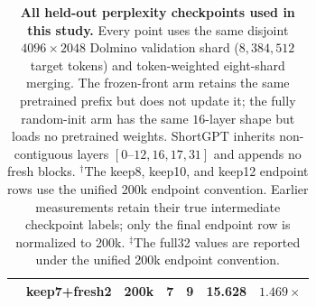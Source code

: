 \begin{table}[t]
{\begin{tabular}{@{}llrrrrr@{}}
& keep7+fresh2 & 200k & 7 & 9 & 15.628 & $1.469\times$ \\
\bottomrule
\end{tabular}%
}
\caption{\textbf{All held-out perplexity checkpoints used in this study.}
Every point uses the same disjoint $4096\times2048$ Dolmino validation shard
($8{,}384{,}512$ target tokens) and token-weighted eight-shard merging. The
frozen-front arm retains the same pretrained prefix but does not update it; the
fully random-init arm has the same $16$-layer shape but loads no pretrained
weights. ShortGPT inherits non-contiguous layers $[0\text{--}12,16,17,31]$
and appends no fresh blocks. $^{\dagger}$The keep8, keep10, and keep12 endpoint
rows use the unified 200k endpoint convention. Earlier measurements retain their true intermediate checkpoint labels; only the final endpoint row is normalized to 200k.
$^{\ddagger}$The full32 values are reported under the unified 200k endpoint convention.}
\label{tab:app-ppl}
\end{table}
